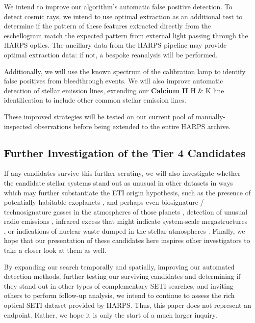 \documentclass[linenumbers]{aastex701}
\providecommand{\DIFadd}[1]{{\bf #1}} %
\providecommand{\DIFaddbegin}{} %
\providecommand{\DIFaddend}{} %
\begin{document}
We intend to improve our algorithm's automatic false positive detection. To detect cosmic rays, we intend to use optimal extraction \citep{horne86optimal_extraction} as an additional test to determine if the pattern of these features extracted directly from the eschellogram  match the expected pattern from external light passing through the HARPS optics. The ancillary data from the HARPS pipeline \citep{HARPS_specs} may provide optimal extraction data: if not, a bespoke reanalysis will be performed. 

Additionally, we will use the known spectrum of the calibration lamp to identify false positives from bleedthrough events.  We will also improve automatic detection of stellar emission lines, extending our  \DIFaddbegin \DIFadd{Calcium II }\DIFaddend H \& K line identification to include other common stellar emission lines.

These improved strategies will be tested on our current pool of manually-inspected observations before being extended to the entire HARPS archive.

\subsection{Further Investigation of the Tier 4 Candidates}
\label{s:automatic_cosmic_ray}

If any candidates survive this further scrutiny, we will also investigate whether the candidate stellar systems stand out as unusual in other datasets in ways which may further substantiate the ETI origin hypothesis, such as the presence of potentially habitable exoplanets \citep{exoplanets}, and perhaps even biosignature / technosignature gasses in the atmospheres of those planets \citep{exoplanetbiosignatures,HAQQMISRA2022194}, detection of unusual radio emissions \citep{BACKUS1998651}, infrared excess that might indicate system-scale megastructures \citep{dysonspheres,TILGNER1998607}, or indications of nuclear waste dumped in the stellar atmospheres \citep{WHITMIRE1980149}. Finally, we hope that our presentation of these candidates here inspires other investigators to take a closer look at them as well.

By expanding our search temporally and spatially, improving our automated detection methods, further testing our surviving candidates and determining if they stand out in other types of complementary SETI searches, and inviting others to perform follow-up analysis, we intend to continue to assess the rich optical SETI dataset provided by HARPS. Thus, this paper does not represent an endpoint. Rather, we hope it is only the start of a much larger inquiry.
\end{document}
